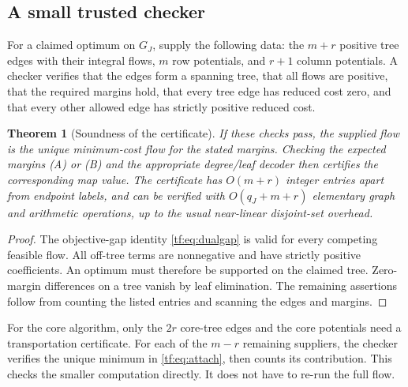 \documentclass[11pt]{article}
\numberwithin{equation}{section}
\newtheorem{theorem}{Theorem}[section]
\theoremstyle{definition}
\begin{document}
\subsection{A small trusted checker}
For a claimed optimum on $G_J$, supply the following data: the $m+r$
positive tree edges with their integral flows, $m$ row potentials, and
$r+1$ column potentials. A checker verifies that the edges form a
spanning tree, that all flows are positive, that the required margins
hold, that every tree edge has reduced cost zero, and that every other
allowed edge has strictly positive reduced cost.

\begin{theorem}[Soundness of the certificate]
\label{tf:thm:certificate}
If these checks pass, the supplied flow is the unique minimum-cost flow
for the stated margins. Checking the expected margins (A) or (B) and the
appropriate degree/leaf decoder then certifies the corresponding map
value. The certificate has $O(m+r)$ integer entries apart from endpoint
labels, and can be verified with $O(q_J+m+r)$ elementary graph and
arithmetic operations, up to the usual near-linear disjoint-set overhead.
\end{theorem}
\begin{proof}
The objective-gap identity \eqref{tf:eq:dualgap} is valid for every competing
feasible flow. All off-tree terms are nonnegative and have strictly
positive coefficients. An optimum must therefore be supported on the
claimed tree. Zero-margin differences on a tree vanish by leaf
elimination. The remaining assertions follow from counting the listed
entries and scanning the edges and margins.
\end{proof}

For the core algorithm, only the $2r$ core-tree edges and the core
potentials need a transportation certificate. For each of the $m-r$
remaining suppliers, the checker verifies the unique minimum in
\eqref{tf:eq:attach}, then counts its contribution. This checks the
smaller computation directly. It does not have to re-run the full flow.
\end{document}

